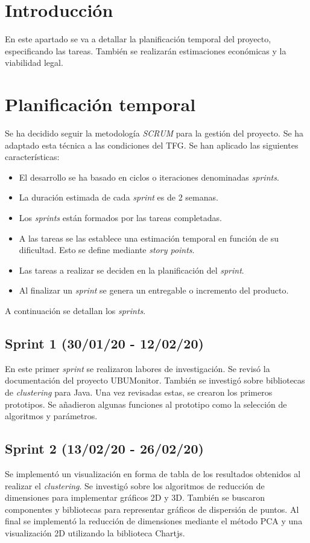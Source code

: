 
\section{Introducción}
En este apartado se va a detallar la planificación temporal del proyecto, especificando las tareas. También se realizarán estimaciones económicas y la viabilidad legal.

\section{Planificación temporal}
Se ha decidido seguir la metodología \emph{SCRUM} para la gestión del proyecto. Se ha adaptado esta técnica a las condiciones del TFG. Se han aplicado las siguientes características:
\begin{itemize}
	\item El desarrollo se ha basado en ciclos o iteraciones denominadas \emph{sprints}.
	\item La duración estimada de cada \emph{sprint} es de 2 semanas.
	\item Los \emph{sprints} están formados por las tareas completadas.
	\item A las tareas se las establece una estimación temporal en función de su dificultad. Esto se define mediante \emph{story points}.
	\item Las tareas a realizar se deciden en la planificación del \emph{sprint}.
	\item Al finalizar un \emph{sprint} se genera un entregable o incremento del producto.
\end{itemize}
A continuación se detallan los \emph{sprints}.

\subsection{Sprint 1 (30/01/20 - 12/02/20)}
En este primer \emph{sprint} se realizaron labores de investigación. Se revisó la documentación del proyecto UBUMonitor. También se investigó sobre bibliotecas de \emph{clustering} para Java. Una vez revisadas estas, se crearon los primeros prototipos. Se añadieron algunas funciones al prototipo como la selección de algoritmos y parámetros.

\subsection{Sprint 2 (13/02/20 - 26/02/20)}
Se implementó un visualización en forma de tabla de los resultados obtenidos al realizar el \emph{clustering}. Se investigó sobre los algoritmos de reducción de dimensiones para implementar gráficos 2D y 3D. También se buscaron componentes y bibliotecas para representar gráficos de dispersión de puntos. Al final se implementó la reducción de dimensiones mediante el método PCA y una visualización 2D utilizando la biblioteca Chartjs.

